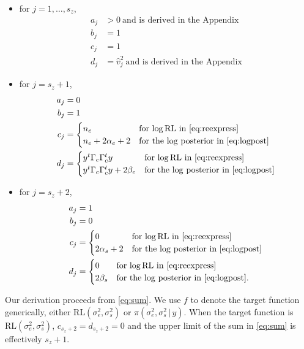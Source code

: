 \documentclass{report}
\newcommand{\RLorig}{\text{RL}}
\newcommand{\logRLorig}{\log\RLorig}
\newcommand{\sigssq}{\sigma_s^2}
\newcommand{\sigesq}{\sigma_e^2}
\newcommand{\g}{\,|\,}
\begin{document}
\begin{itemize}[label=---]
\item for $j = 1, \dots, s_z$,
  \begin{align*}
    a_j &> 0\ \text{and is derived in the Appendix}\\
    b_j &=1\\
    c_j &=1\\
    d_j &= \hat v_j^2\ \text{and is derived in the Appendix}
  \end{align*}
\item for $j = s_z +1$,
  \begin{align*}
    a_j &= 0\\
    b_j &= 1\\
    c_j &= \begin{cases}
                 n_e & \text{for $\logRLorig$ in \eqref{eq:reexpress}}\\
                 n_e + 2\alpha_e + 2 & \text{for the $\log$ posterior in \eqref{eq:logpost}}
              \end{cases}\\
    d_j &= \begin{cases}
                 y^t \Gamma_c \Gamma^t_c y & \text{for $\logRLorig$ in \eqref{eq:reexpress}}\\
                 y^t \Gamma_c \Gamma^t_c y + 2\beta_e & \text{for the $\log$ posterior in \eqref{eq:logpost}}
              \end{cases}
  \end{align*}
\item for $j = s_z+2$,
  \begin{align*}
    a_j &= 1\\
    b_j &= 0\\
    c_j &= \begin{cases}
      0 & \text{for $\logRLorig$ in \eqref{eq:reexpress}}\\
      2 \alpha_s + 2 & \text{for the $\log$ posterior in \eqref{eq:logpost}}
    \end{cases}\\
    d_j &= \begin{cases}
      0 & \text{for $\logRLorig$ in \eqref{eq:reexpress}}\\
      2 \beta_s & \text{for the $\log$ posterior in \eqref{eq:logpost}}.
    \end{cases}
  \end{align*}
\end{itemize}
Our derivation proceeds from \eqref{eq:sum}.  We use $f$ to denote the target function generically, either $\RLorig(\sigesq,\sigssq)$ or $\pi(\sigesq,\sigssq\g y)$.  When the target function is $\RLorig(\sigesq,\sigssq)$, $c_{s_z+2} = d_{s_z+2} = 0$ and the upper limit of the sum in \eqref{eq:sum} is effectively $s_z+1$.
\end{document}
